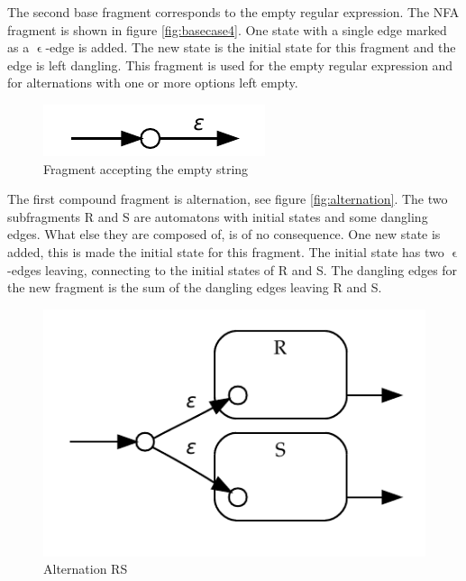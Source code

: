 The second base fragment corresponds to the empty regular
expression. The NFA fragment is shown in figure
\vref{fig:basecase4}. One state with a single edge marked as a
$\upvarepsilon$-edge is added. The new state is the initial state for
this fragment and the edge is left dangling. This fragment is used for
the empty regular expression and for alternations with one or more
options left empty.





\begin{figure}
  \centering
  \includegraphics{parsing/basecase4}
  \caption{Fragment accepting the empty string}
  \label{fig:basecase4}
\end{figure}



The first compound fragment is alternation, see figure
\vref{fig:alternation}. The two subfragments R and S are automatons
with initial states and some dangling edges. What else they are
composed of, is of no consequence. One new state is added, this is
made the initial state for this fragment. The initial state has two
$\upvarepsilon$-edges leaving, connecting to the initial states of R
and S. The dangling edges for the new fragment is the sum of the
dangling edges leaving R and S.

\begin{figure}
  \centering
  \includegraphics{parsing/alternation}
  \caption{Alternation R\textbar S}
  \label{fig:alternation}
\end{figure}

